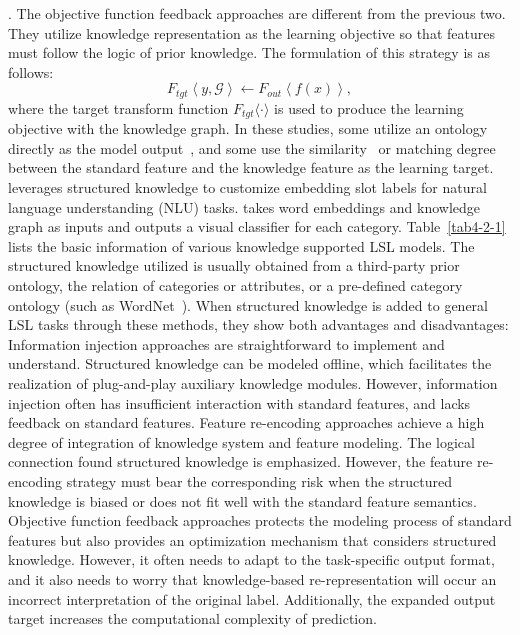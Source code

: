 \uppercase\expandafter{}. The objective function feedback approaches are different from the previous two. They utilize knowledge representation as the learning objective so that features must follow the logic of prior knowledge. The formulation of this strategy is as follows:
\begin{equation}
\label{eq4-2-3}
F_{tgt} \left\langle y, \mathcal{G} \right\rangle \leftarrow F_{out} \left\langle f(x) \right\rangle,
\end{equation}
where the target transform function $F_{tgt}\langle \cdot \rangle$ is used to produce the learning objective with the knowledge graph. In these studies, some utilize an ontology directly as the model output~, and some use the similarity~ or matching degree~ between the standard feature and the knowledge feature as the learning target.  leverages structured knowledge to customize embedding slot labels for natural language understanding (NLU) tasks.   takes word embeddings and knowledge graph as inputs and outputs a visual classifier for each category.
Table~\ref{tab4-2-1} lists the basic information of various knowledge supported LSL models. The structured knowledge  utilized is usually obtained from a third-party prior ontology, the relation of categories or attributes, or a pre-defined category ontology (such as WordNet~). When structured knowledge is added to general LSL tasks through these methods, they show both advantages and disadvantages:
Information injection approaches are straightforward to implement and understand. Structured knowledge can be modeled offline, which facilitates the realization of plug-and-play auxiliary knowledge  modules. However, information injection often has insufficient interaction with standard features, and lacks feedback on standard features.
Feature re-encoding approaches achieve a high degree of integration of knowledge system and feature modeling. The logical connection found structured knowledge is emphasized. However, the feature re-encoding strategy must bear the corresponding risk when the structured knowledge is biased or does not fit well with the standard feature semantics.
Objective function feedback approaches protects the modeling process of standard features but also provides an optimization mechanism that considers structured knowledge. However, it often needs to adapt to the task-specific output format, and it also needs to worry that knowledge-based re-representation will occur an incorrect interpretation of the original label. Additionally, the expanded output target increases the computational complexity of prediction.

